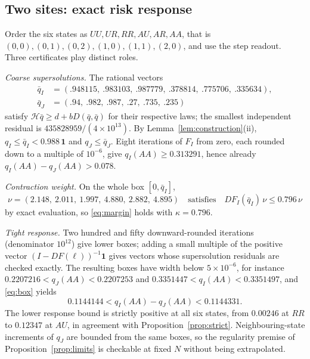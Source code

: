 \documentclass[11pt]{article}
\theoremstyle{remark}
\newcommand{\one}{\mathbf 1}
\newcommand{\Hm}{\mathcal H}
\begin{document}
\subsection{Two sites: exact risk response}
Order the six states as $UU,UR,RR,AU,AR,AA$, that is
$(0,0),(0,1),(0,2),(1,0),(1,1),(2,0)$, and use the step readout. Three
certificates play distinct roles.

\emph{Coarse supersolutions.} The rational vectors
\begin{align*}
 \bar q_I&=(.948115,\ .983103,\ .987779,\ .378814,\ .775706,\ .335634),\\
 \bar q_J&=(.94,\ .982,\ .987,\ .27,\ .735,\ .235)
\end{align*}
satisfy $\Hm\bar q\ge d+bD(\bar q,\bar q)$ for their respective laws; the
smallest independent residual is $435828959/(4\times10^{13})$. By
Lemma~\ref{lem:construction}(ii), $q_I\le\bar q_I<0.988\,\one$ and
$q_J\le\bar q_J$. Eight iterations of $F_I$ from zero, each rounded down to a
multiple of $10^{-6}$, give $q_I(AA)\ge0.313291$, hence already
$q_I(AA)-q_J(AA)>0.078$.

\emph{Contraction weight.} On the whole box $[0,\bar q_I]$,
\[
 \nu=(2.148,\ 2.011,\ 1.997,\ 4.880,\ 2.882,\ 4.895)\quad\text{satisfies}\quad DF_I(\bar q_I)\,\nu\le0.796\,\nu
\]
by exact evaluation, so \eqref{eq:margin} holds with $\kappa=0.796$.

\emph{Tight response.} Two hundred and fifty downward-rounded iterations
(denominator $10^{12}$) give lower boxes; adding a small multiple of the
positive vector $(I-DF(\ell))^{-1}\one$ gives vectors whose supersolution
residuals are checked exactly. The resulting boxes have width below
$5\times10^{-6}$, for instance
$0.2207216<q_J(AA)<0.2207253$ and $0.3351447<q_I(AA)<0.3351497$, and
\eqref{eq:box} yields
\begin{equation}\label{eq:tightgap}
 0.1144144<q_I(AA)-q_J(AA)<0.1144331 .
\end{equation}
The lower response bound is strictly positive at all six states, from
$0.00246$ at $RR$ to $0.12347$ at $AU$, in agreement with
Proposition~\ref{prop:strict}. Neighbouring-state increments of $q_J$ are
bounded from the same boxes, so the regularity premise of
Proposition~\ref{prop:limits} is checkable at fixed $N$ without being
extrapolated.
\end{document}
